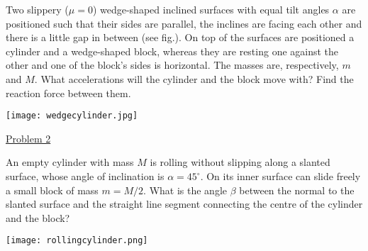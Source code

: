 \documentclass[11pt]{scrartcl}
\begin{document}
\begin{problem}
Two slippery ($\mu = 0$) wedge-shaped inclined surfaces with equal tilt angles $\alpha$ are positioned such that their sides are parallel, the inclines are facing each other and there is a little gap in between (see fig.). On top of the surfaces are positioned a cylinder and a wedge-shaped block, whereas they are resting one against the other and one of the block’s sides is horizontal. The masses are, respectively, $m$ and $M$. What accelerations will the cylinder and the block move with? Find the reaction force between them.
\begin{center}
    \texttt{[image: wedgecylinder.jpg]}
\end{center}
\end{problem}
\begin{problem}[1984 IPhO]
\href{https://www.ioc.ee/~kree/students/iphoTable/files/ipho/1984_Sweden_p2.pdf}{Problem 2}
\end{problem}
\begin{problem}[Kalda]
An empty cylinder with mass $M$ is rolling without slipping along a slanted surface, whose angle of inclination is $\alpha = 45^{\circ}$. On its inner surface can slide freely a small block of mass $m = M/2$. What is the angle $\beta$ between the normal to the slanted surface and the straight line segment connecting the centre of the cylinder and the block?
\begin{center}
    \texttt{[image: rollingcylinder.png]}
\end{center}
\end{problem}
\end{document}

